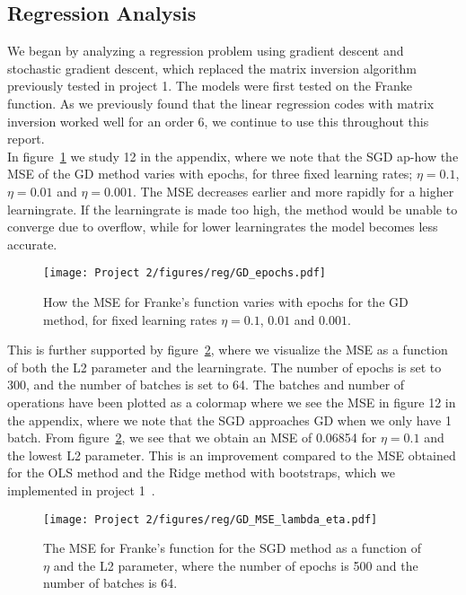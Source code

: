 \documentclass[english,notitlepage,reprint,nofootinbib]{revtex4-2}  %
\begin{document}
\subsection*{Regression Analysis}
We began by analyzing a regression problem using gradient descent and stochastic gradient descent, which replaced the matrix inversion algorithm previously tested in project 1. 
The models were first tested on the Franke function. 
As we previously found that the linear regression codes with matrix inversion worked well for an order 6, we continue to use this throughout this report. 
\vspace{3mm}
\\ 
In figure~\ref{fig: a1} we study 12 in the appendix, where we note that the SGD ap-how the MSE of the GD method varies with epochs, for three fixed learning rates; $\eta=0.1$, $\eta=0.01$ and $\eta=0.001$. The MSE decreases earlier and more rapidly for a higher learningrate. If the learningrate is made too high, the method would be unable to converge due to overflow, while for lower learningrates the model becomes less accurate. 
\begin{figure}[h!]
    \centering %
    \texttt{[image: Project 2/figures/reg/GD\_epochs.pdf]} 
    \caption{How the MSE for Franke's function varies with epochs for the GD method, for fixed learning rates $\eta=0.1$, $0.01$ and $0.001$. }
    \label{fig: a1}
\end{figure}
This is further supported by figure~\ref{fig: a2}, where we visualize the MSE as a function of both the L2 parameter and the learningrate. The number of epochs is set to 300, and the number of batches is set to 64. The batches and number of operations have been plotted as a colormap where we see the MSE in figure 12
in the appendix, where we note that the SGD approaches GD when we only have 1 batch. 
From figure~\ref{fig: a2}, we see that we obtain an MSE of 0.06854 for $\eta=0.1$ and the lowest L2 parameter. This is an improvement compared to the MSE obtained for the OLS method and the Ridge method with bootstraps, which we implemented in project 1~\cite{proj1}. 
\begin{figure}[h!]
    \centering %
    \texttt{[image: Project 2/figures/reg/GD\_MSE\_lambda\_eta.pdf]} 
    \caption{The MSE for Franke's function for the SGD method as a function of $\eta$ and the L2 parameter, where the number of epochs is 500 and the number of batches is 64.}
    \label{fig: a2}
\end{figure}
\end{document}
